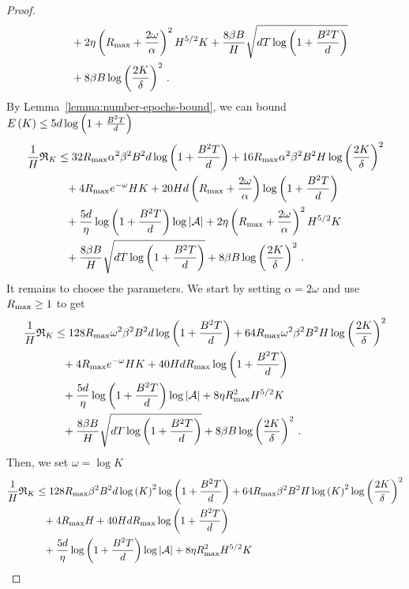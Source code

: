 \begin{proof}
\begin{align*}
        &\phantom{=}+ 2 \eta \left( R_{\max} + \frac{2 \omega}{\alpha} \right)^2 H^{5/2} K + \frac{8 \beta B}{H} \sqrt{d T \log \left( 1 + \frac{B^2 T}{d} \right)} \\
        &\phantom{=}+ 8 \beta B \log \left( \frac{2 K}{\delta} \right)^2\,.
    \end{align*}
    By Lemma~\ref{lemma:number-epochs-bound}, we can bound $E \left( K \right) \leq 5 d \log \left( 1 + \frac{B^2 T}{d} \right)$
    \begin{align*}
        \frac1H \mathfrak{R}_K &\leq 32 R_{\max} \alpha^2 \beta^2 B^2 d \log \left( 1 + \frac{B^2 T}{d} \right) + 16 R_{\max} \alpha^2 \beta^2 B^2 H \log \left( \frac{2 K}{\delta} \right)^2 \\
        &\phantom{=}+ 4 R_{\max} e^{- \omega} H K + 20 H d \left( R_{\max} + \frac{2 \omega}{\alpha} \right) \log \left( 1 + \frac{B^2 T}{d} \right) \\
        &\phantom{=}+ \frac{5 d}{\eta} \log \left( 1 + \frac{B^2 T}{d} \right) \log \left|\mathcal{A}\right| + 2 \eta \left( R_{\max} + \frac{2 \omega}{\alpha} \right)^2 H^{5/2} K \\
        &\phantom{=}+ \frac{8 \beta B}{H} \sqrt{d T \log \left( 1 + \frac{B^2 T}{d} \right)} + 8 \beta B \log \left( \frac{2 K}{\delta} \right)^2\,.
    \end{align*}
    It remains to choose the parameters. We start by setting $\alpha = 2 \omega$ and use $R_{\max} \geq 1$ to get
    \begin{align*}
        \frac1H \mathfrak{R}_K &\leq 128 R_{\max} \omega^2 \beta^2 B^2 d \log \left( 1 + \frac{B^2 T}{d} \right) + 64 R_{\max} \omega^2 \beta^2 B^2 H \log \left( \frac{2 K}{\delta} \right)^2 \\
        &\phantom{=}+ 4 R_{\max} e^{- \omega} H K + 40 H d R_{\max} \log \left( 1 + \frac{B^2 T}{d} \right) \\
        &\phantom{=}+ \frac{5 d}{\eta} \log \left( 1 + \frac{B^2 T}{d} \right) \log \left|\mathcal{A}\right| + 8 \eta R_{\max}^2 H^{5/2} K \\
        &\phantom{=}+ \frac{8 \beta B}{H} \sqrt{d T \log \left( 1 + \frac{B^2 T}{d} \right)} + 8 \beta B \log \left( \frac{2 K}{\delta} \right)^2\,.
    \end{align*}
    Then, we set $\omega = \log K$
    \begin{align*}
        \frac1H \regretK &\leq 128 \RMAX \beta^2 B^2 d \log \spr{K}^2 \log \spr{1 + \frac{B^2 T}{d}} + 64 \RMAX \beta^2 B^2 H \log \spr{K}^2 \log \spr{\frac{2 K}{\delta}}^2 \\
        &\phantom{=}+ 4 \RMAX H + 40 H d \RMAX \log \spr{1 + \frac{B^2 T}{d}} \\
        &\phantom{=}+ \frac{5 d}{\eta} \log \spr{1 + \frac{B^2 T}{d}} \log \abs{\cA} + 8 \eta \RMAX^2 H^{5/2} K \\

\end{align*}
\end{proof}
